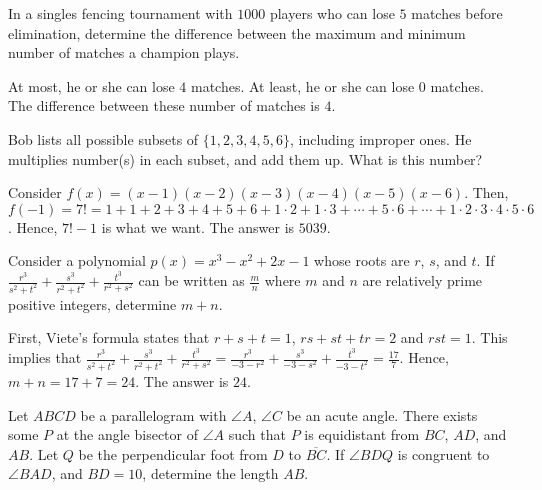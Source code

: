 \begin{problem}
In a singles fencing tournament with $1000$ players who can lose $5$ matches before elimination, determine the difference between the maximum and minimum number of matches a champion plays.
\end{problem}

\begin{solution}
At most, he or she can lose $4$ matches. At least, he or she can lose $0$ matches. The difference between these number of matches is $4$.
\end{solution}

\begin{problem}
Bob lists all possible subsets of $\{1,2,3,4,5,6\}$, including improper ones. He multiplies number(s) in each subset, and add them up. What is this number?
\end{problem}

\begin{solution}
Consider $f(x)=(x-1)(x-2)(x-3)(x-4)(x-5)(x-6)$. Then, $f(-1)=7!=1+1+2+3+4+5+6+1\cdot2+1\cdot3+\cdots+5\cdot6+\cdots+1\cdot2\cdot3\cdot4\cdot5\cdot6$. Hence, $7!-1$ is what we want. The answer is $5039$.
\end{solution}

\begin{problem}
Consider a polynomial $p(x)=x^3-x^2+2x-1$ whose roots are $r$, $s$, and $t$. If $\frac{r^3}{s^2+t^2}+\frac{s^3}{r^2+t^2}+\frac{t^3}{r^2+s^2}$ can be written as $\frac{m}{n}$ where $m$ and $n$ are relatively prime positive integers, determine $m+n$.
\end{problem}

\begin{solution}
First, Viete's formula states that $r+s+t=1$, $rs+st+tr=2$ and $rst=1$. This implies that $\frac{r^3}{s^2+t^2}+\frac{s^3}{r^2+t^2}+\frac{t^3}{r^2+s^2}=\frac{r^3}{-3-r^2}+\frac{s^3}{-3-s^2}+\frac{t^3}{-3-t^2}=\frac{17}{7}$. Hence, $m+n=17+7=24$. The answer is $24$.
\end{solution}

\begin{problem}
Let $ABCD$ be a parallelogram with $\angle A$, $\angle C$ be an acute angle. There exists some $P$ at the angle bisector of $\angle A$ such that $P$ is equidistant from $BC$, $AD$, and $AB$. Let $Q$ be the perpendicular foot from $D$ to $\overline{BC}$. If $\angle BDQ$ is congruent to $\angle BAD$, and $BD=10$, determine the length $AB$.
\end{problem}

